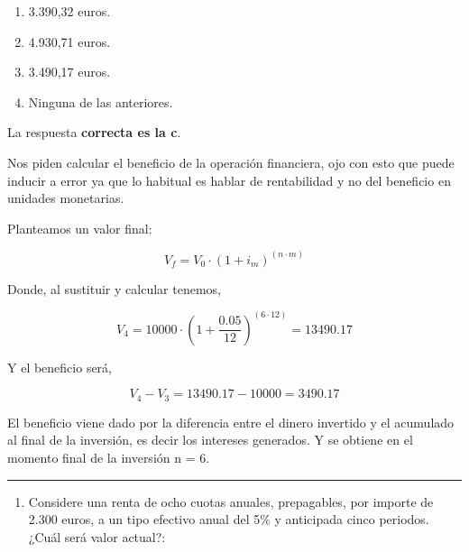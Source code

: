 \documentclass[
  letterpaper,
  DIV=11,
  numbers=noendperiod]{scrreprt}
\providecommand{\tightlist}{%
  \setlength{\itemsep}{0pt}\setlength{\parskip}{0pt}}\usepackage{longtable,booktabs,array}
\begin{document}
\begin{enumerate}
\def\labelenumi{\alph{enumi}.}
\item
  3.390,32 euros.
\item
  4.930,71 euros.
\item
  3.490,17 euros.
\item
  Ninguna de las anteriores.
\end{enumerate}

\begin{tcolorbox}[enhanced jigsaw, left=2mm, opacityback=0, colback=white, breakable, arc=.35mm, bottomrule=.15mm, rightrule=.15mm, toprule=.15mm, leftrule=.75mm, colframe=quarto-callout-tip-color-frame]
\begin{minipage}[t]{5.5mm}
\textcolor{quarto-callout-tip-color}{\faLightbulb}
\end{minipage}%
\begin{minipage}[t]{\textwidth - 5.5mm}

La respuesta \textbf{correcta es la c}.

Nos piden calcular el beneficio de la operación financiera, ojo con esto
que puede inducir a error ya que lo habitual es hablar de rentabilidad y
no del beneficio en unidades monetarias.

Planteamos un valor final:

\[V_{f}=V_0\cdot\left(1+i_m\right)^{(n\cdot m)}\]

Donde, al sustituir y calcular tenemos,

\[V_4=10000\cdot\left(1+\frac{ 0.05}{12 }\right)^{(6\cdot12)}=13490.17\]

Y el beneficio será,

\[V_4-V_3=13490.17-10000=3490.17\]

El beneficio viene dado por la diferencia entre el dinero invertido y el
acumulado al final de la inversión, es decir los intereses generados. Y
se obtiene en el momento final de la inversión n = 6.

\end{minipage}%
\end{tcolorbox}

\begin{center}\rule{0.5\linewidth}{0.5pt}\end{center}

\begin{enumerate}
\def\labelenumi{\arabic{enumi}.}
\setcounter{enumi}{82}
\tightlist
\item
  Considere una renta de ocho cuotas anuales, prepagables, por importe
  de 2.300 euros, a un tipo efectivo anual del 5\% y anticipada cinco
  periodos. ¿Cuál será valor actual?:
\end{enumerate}
\end{document}
